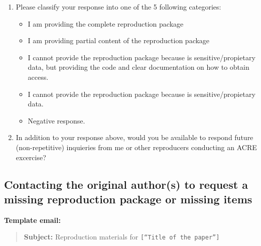 \documentclass[]{book}
\providecommand{\tightlist}{%
  \setlength{\itemsep}{0pt}\setlength{\parskip}{0pt}}
\begin{document}
\begin{enumerate}
\def\labelenumi{\arabic{enumi}.}
\tightlist
\item
  Please classify your response into one of the 5 following categories:

  \begin{itemize}
  \tightlist
  \item
    I am providing the complete reproduction package
  \item
    I am providing partial content of the reproduction package
  \item
    I cannot provide the reproduction package because is sensitive/propietary data, but providing the code and clear documentation on how to obtain access.
  \item
    I cannot provide the reproduction package because is sensitive/propietary data.
  \item
    Negative response.
  \end{itemize}
\item
  In addition to your response above, would you be available to respond future (non-repetitive) inquieries from me or other reproducers conducting an ACRE excercise?
\end{enumerate}

\hypertarget{contacting-the-original-authors-to-request-a-missing-reproduction-package-or-missing-items}{%
\subsection{Contacting the original author(s) to request a missing reproduction package or missing items}\label{contacting-the-original-authors-to-request-a-missing-reproduction-package-or-missing-items}}

\textbf{Template email:}

\begin{quote}
\textbf{Subject:} Reproduction materials for \texttt{{[}“Title\ of\ the\ paper”{]}}
\end{quote}
\end{document}

